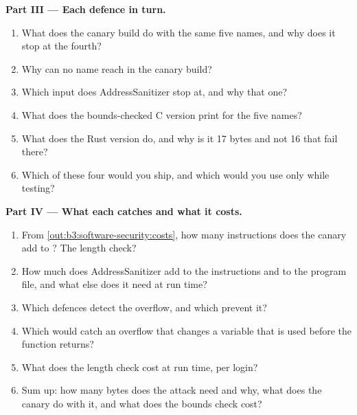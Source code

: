 \begin{problem}
\medskip\noindent\textbf{Part III --- Each defence in turn.}
\begin{enumerate}[resume]
  \item What does the canary build do with the same five names, and why does it stop at the fourth?
  \item Why can no name reach  in the canary build?
  \item Which input does AddressSanitizer stop at, and why that one?
  \item What does the bounds-checked C version print for the five names?
  \item What does the Rust version do, and why is it 17 bytes and not 16 that fail there?
  \item Which of these four would you ship, and which would you use only while testing?
\end{enumerate}

\medskip\noindent\textbf{Part IV --- What each catches and what it costs.}
\begin{enumerate}[resume]
  \item From \cref{out:b3:software-security:costs}, how many instructions does the canary add to ? The length check?
  \item How much does AddressSanitizer add to the instructions and to the program file, and what else does it need at run time?
  \item Which defences detect the overflow, and which prevent it?
  \item Which would catch an overflow that changes a variable that is used before the function returns?
  \item What does the length check cost at run time, per login?
  \item Sum up: how many bytes does the attack need and why, what does the canary do with it, and what does the bounds check cost?
\end{enumerate}
\end{problem}
